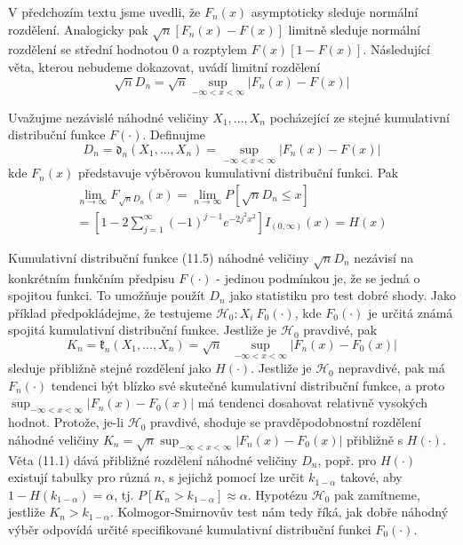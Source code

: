 V předchozím textu jsme uvedli, že $F_n(x)$ asymptoticky sleduje normální rozdělení. Analogicky pak $\sqrt{n}[F_n(x) - F(x)]$ limitně sleduje normální rozdělení se střední hodnotou 0 a rozptylem $F(x)[1 - F(x)]$. Následující věta, kterou nebudeme dokazovat, uvádí limitní rozdělení
\begin{equation*}
\sqrt{n}D_n = \sqrt{n} \sup_{-\infty < x < \infty}|F_n(x) - F(x)|
\end{equation*}
\begin{theorem}
Uvažujme nezávislé náhodné veličiny $X_1, ..., X_n$ pocházející ze stejné kumulativní distribuční funkce $F(\cdot)$. Definujme
\begin{equation*}
D_n = \mathfrak{d}_n(X_1, ..., X_n) = \sup_{-\infty < x < \infty}|F_n(x) - F(x)|
\end{equation*}
kde $F_n(x)$ představuje výběrovou kumulativní distribuční funkci. Pak
\begin{multline}
\lim_{n \rightarrow \infty}F_{\sqrt{n}D_n}(x) = \lim_{n \rightarrow \infty}P[\sqrt{n}D_n \le x]\\
=\left[1 - 2 \sum_{j = 1}^{\infty}(-1)^{j - 1}e^{-2j^2x^2}\right] I_{(0, \infty)}(x) = H(x)
\end{multline}
\end{theorem}
Kumulativní distribuční funkce (11.5) náhodné veličiny $\sqrt{n}D_n$ nezávisí na konkrétním funkčním předpisu $F(\cdot)$ - jedinou podmínkou je, že se jedná o spojitou funkci. To umožňuje použít $D_n$ jako statistiku pro test dobré shody. Jako příklad předpokládejme, že testujeme $\mathscr{H}_0: X_i ~ F_0(\cdot)$, kde $F_0(\cdot)$ je určitá známá spojitá kumulativní distribuční funkce. Jestliže je $\mathscr{H}_0$ pravdivé, pak
\begin{equation}
K_n = \mathfrak{k}_n(X_1, ..., X_n) = \sqrt{n} ~~~ \sup_{-\infty < x < \infty}|F_n(x) - F_0(x)|
\end{equation}
sleduje přibližně stejné rozdělení jako $H(\cdot)$. Jestliže je $\mathscr{H}_0$ nepravdivé, pak má $F_n(\cdot)$ tendenci být blízko své skutečné kumulativní distribuční funkce, a proto $\sup_{-\infty < x < \infty}|F_n(x) - F_0(x)|$ má tendenci dosahovat relativně vysokých hodnot. Protože, je-li $\mathscr{H}_0$ pravdivé, shoduje se pravděpodobnostní rozdělení náhodné veličiny $K_n = \sqrt{n} \sup_{-\infty < x < \infty}|F_n(x) - F_0(x)|$ přibližně s $H(\cdot)$. Věta (11.1) dává přibližné rozdělení náhodné veličiny $D_n$, popř. pro $H(\cdot)$ existují tabulky pro různá $n$, s jejichž pomocí lze určit $k_{1 - \alpha}$ takové, aby $1 - H(k_{1 - \alpha}) = \alpha$, tj. $P[K_n > k_{1 - \alpha}] \approx \alpha$. Hypotézu $\mathscr{H}_0$ pak zamítneme, jestliže $K_n > k_{1 - \alpha}$. Kolmogor-Smirnovův test nám tedy říká, jak dobře náhodný výběr odpovídá určité specifikované kumulativní distribuční funkci $F_0(\cdot)$.

